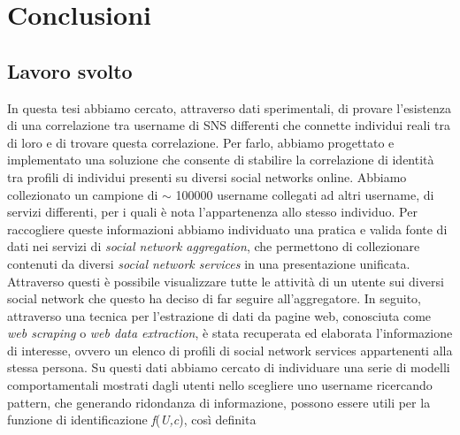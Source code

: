 \chapter{Conclusioni}
\label{cap5}
\setcounter{figure}{0}


\section{Lavoro svolto}
In questa tesi abbiamo cercato, attraverso dati sperimentali, di provare l'esistenza di una correlazione tra username di SNS differenti che connette individui reali tra di loro e di trovare questa correlazione. Per farlo, abbiamo progettato e implementato una soluzione
che consente di stabilire la correlazione di identità tra profili di individui presenti su diversi social networks online. Abbiamo collezionato un campione di $\sim$ 100000 username collegati ad altri username, di servizi differenti, per i quali è nota l'appartenenza allo stesso individuo. Per raccogliere queste informazioni abbiamo individuato una pratica e valida fonte di dati nei servizi di \textit{social network aggregation}, che permettono di collezionare contenuti da diversi \textit{social network services} in una presentazione unificata. Attraverso questi è possibile visualizzare tutte le attività di un utente sui diversi social network che questo ha deciso di far seguire all'aggregatore. In seguito, attraverso una tecnica per l'estrazione di dati da pagine web, conosciuta come \textit{web scraping} o \textit{web data extraction}, è stata recuperata ed elaborata l'informazione di interesse, ovvero un elenco di profili di social network services appartenenti alla stessa persona. Su questi dati abbiamo cercato di individuare una serie di modelli comportamentali mostrati dagli utenti nello scegliere uno username ricercando pattern, che generando ridondanza di informazione, possono essere utili per la funzione di identificazione \textit{f}(\textit{U,c}), così definita


